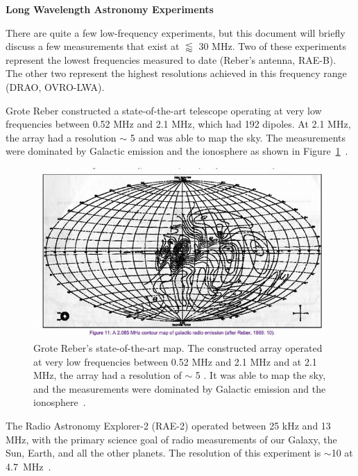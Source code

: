 {\bf{Long Wavelength Astronomy Experiments}}

There are quite a few low-frequency experiments, but this document will briefly discuss a few measurements that exist at $\lessapprox$ 30 MHz. Two of these experiments represent the lowest frequencies measured to date (Reber's antenna, RAE-B). The other two represent the highest resolutions achieved in this frequency range (DRAO, OVRO-LWA).

Grote Reber constructed a state-of-the-art telescope operating at very low frequencies between 0.52 MHz and 2.1 MHz, which had 192 dipoles. At 2.1 MHz, the array had a resolution $\sim$ 5 \degree and was able to map the sky. The measurements were dominated by Galactic emission and the ionosphere as shown in Figure~\ref{Fig:Rebermap}~\citep{1988JRASC..82...93R}. 

\begin{figure}
	\centering
	\includegraphics[width=\linewidth]{Figures/Rebermap}
	\caption{Grote Reber's state-of-the-art map. The constructed array operated at very low frequencies between 0.52 MHz and 2.1 MHz and at 2.1 MHz, the array had a resolution of $\sim$ 5 \degree. It was able to map the sky, and the measurements were dominated by Galactic emission and the ionosphere~\citep{1988JRASC..82...93R}.}
	\label{Fig:Rebermap}
\end{figure}

The Radio Astronomy Explorer-2 (RAE-2) operated between 25 kHz and 13 MHz, with the primary science goal of radio measurements of our Galaxy, the Sun, Earth, and all the other planets. The resolution of this experiment is $\sim$10 \degree at \SI{4.7}{\mega\hertz}~\citep{1975A&A....40..365A}.

